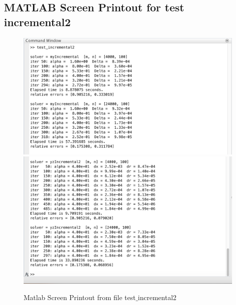 \subsection*{MATLAB Screen Printout for test incremental2}
\begin{figure}[H]
\centering
\includegraphics[width=18cm]{f_11}
\includegraphics[width=18cm]{f_12}
\caption{Matlab Screen Printout from file test$\_$incremental2}
\end{figure}


\clearpage
